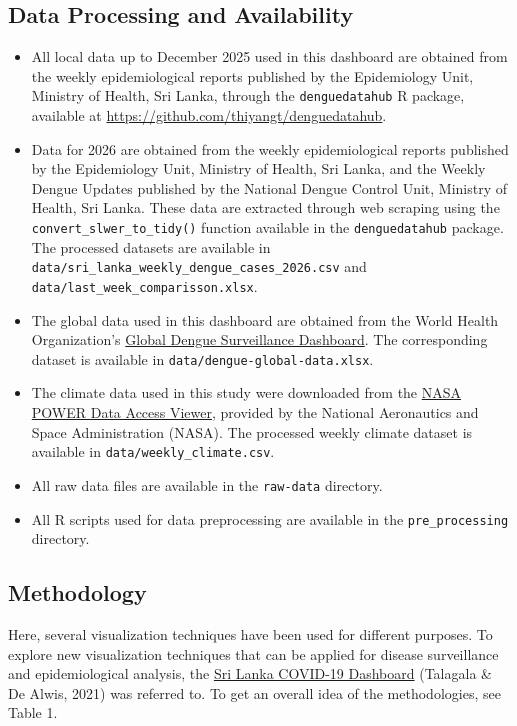 \documentclass[
  letterpaper,
  DIV=11,
  numbers=noendperiod]{scrartcl}
\begin{document}
\subsection{Data Processing and
Availability}\label{data-processing-and-availability}

\begin{itemize}
\item
  All local data up to December 2025 used in this dashboard are obtained
  from the weekly epidemiological reports published by the Epidemiology
  Unit, Ministry of Health, Sri Lanka, through the
  \texttt{denguedatahub} R package, available at
  \url{https://github.com/thiyangt/denguedatahub}.
\item
  Data for 2026 are obtained from the weekly epidemiological reports
  published by the Epidemiology Unit, Ministry of Health, Sri Lanka, and
  the Weekly Dengue Updates published by the National Dengue Control
  Unit, Ministry of Health, Sri Lanka. These data are extracted through
  web scraping using the \texttt{convert\_slwer\_to\_tidy()} function
  available in the \texttt{denguedatahub} package. The processed
  datasets are available in
  \texttt{data/sri\_lanka\_weekly\_dengue\_cases\_2026.csv} and
  \texttt{data/last\_week\_comparisson.xlsx}.
\item
  The global data used in this dashboard are obtained from the World
  Health Organization's
  \href{https://worldhealthorg.shinyapps.io/dengue_global/}{Global
  Dengue Surveillance Dashboard}. The corresponding dataset is available
  in \texttt{data/dengue-global-data.xlsx}.
\item
  The climate data used in this study were downloaded from the
  \href{https://power.larc.nasa.gov/data-access-viewer/}{NASA POWER Data
  Access Viewer}, provided by the National Aeronautics and Space
  Administration (NASA). The processed weekly climate dataset is
  available in \texttt{data/weekly\_climate.csv}.
\item
  All raw data files are available in the \texttt{raw-data} directory.
\item
  All R scripts used for data preprocessing are available in the
  \texttt{pre\_processing} directory.
\end{itemize}

\subsection{Methodology}\label{methodology}

Here, several visualization techniques have been used for different
purposes. To explore new visualization techniques that can be applied
for disease surveillance and epidemiological analysis, the
\href{https://thiyangt.github.io/coviddashboard/}{Sri Lanka COVID-19
Dashboard} (Talagala \& De Alwis, 2021) was referred to. To get an
overall idea of the methodologies, see Table 1.
\end{document}
